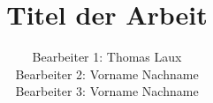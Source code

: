\documentclass[envcountsame,envcountchap, deutsch]{i-studis}
\begin{document}
\title{Titel der Arbeit}
\author{Bearbeiter 1: Thomas Laux \\Bearbeiter 2: Vorname Nachname \\Bearbeiter 3: Vorname Nachname}							%
\address{Ort,} 							%
\begingroup
  \renewcommand{\thepage}{Titel}
  \mytitlepage
  \newpage
\endgroup
\frontmatter 
\tableofcontents 						%
\mainmatter                        		%





\backmatter                        		%
\printindex 							%
\begin{appendix}						%
\end{appendix}
\end{document}
